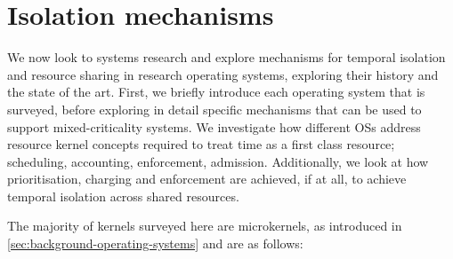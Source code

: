 \section{Isolation mechanisms}

We now look to systems research and explore mechanisms for temporal isolation and resource sharing
in research operating systems, exploring their history and the state of the art. First, we briefly
introduce each operating system that is surveyed, before exploring in detail specific mechanisms
that can be used to support mixed-criticality systems. We investigate how different \glspl{OS}
address resource kernel concepts required to treat time as a first class resource; scheduling,
accounting, enforcement, admission. Additionally, we look at how prioritisation, charging and
enforcement are achieved, if at all, to achieve temporal isolation across shared resources.

The majority of kernels surveyed here are microkernels, as introduced in
\cref{sec:background-operating-systems} and are as follows: 

